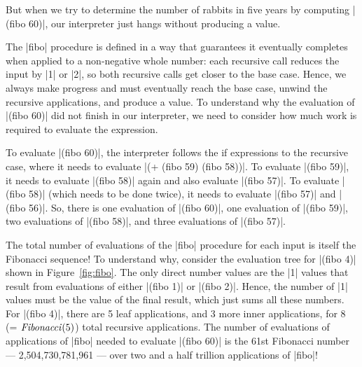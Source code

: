 \begin{schemeregion}
{But when we try to determine the number of rabbits in five years by computing \scheme|(fibo 60)|, our interpreter just hangs without producing a value.%

The \scheme|fibo| procedure is defined in a way that guarantees it eventually completes when applied to a non-negative whole number: each recursive call reduces the input by \scheme|1| or \scheme|2|, so both recursive calls get closer to the base case.  Hence, we always make progress and must eventually reach the base case, unwind the recursive applications, and produce a value.  To understand why the evaluation of \scheme|(fibo 60)| did not finish in our interpreter, we need to consider how much work is required to evaluate the expression.  

To evaluate \scheme|(fibo 60)|, the interpreter follows the if expressions to the recursive case, where it needs to evaluate \scheme|(+ (fibo 59) (fibo 58))|.  To evaluate \scheme|(fibo 59)|, it needs to evaluate \scheme|(fibo 58)| again and also evaluate \scheme|(fibo 57)|.  To evaluate \scheme|(fibo 58)| (which needs to be done twice), it needs to evaluate \scheme|(fibo 57)| and \scheme|(fibo 56)|.  So, there is one evaluation of \scheme|(fibo 60)|, one evaluation of \scheme|(fibo 59)|, two evaluations of \scheme|(fibo 58)|, and three evaluations of \scheme|(fibo 57)|.  

The total number of evaluations of the \scheme|fibo| procedure for each input is itself the Fibonacci sequence!  To understand why, consider the evaluation tree for \scheme|(fibo 4)| shown in Figure~\ref{fig:fibo}.  The only direct number values are the \schemeresult|1| values that result from evaluations of either \scheme|(fibo 1)| or \scheme|(fibo 2)|.  Hence, the number of \schemeresult|1| values must be the value of the final result, which just sums all these numbers.   For \scheme|(fibo 4)|, there are 5 leaf applications, and 3 more inner applications, for 8 (= $\textrm{\emph{Fibonacci}}(5)$) total recursive applications.  The number of evaluations of applications of \scheme|fibo| needed to evaluate \scheme|(fibo 60)| is the 61st Fibonacci number --- 2,504,730,781,961 --- over two and a half trillion applications of \scheme|fibo|!  

}
\end{schemeregion}
